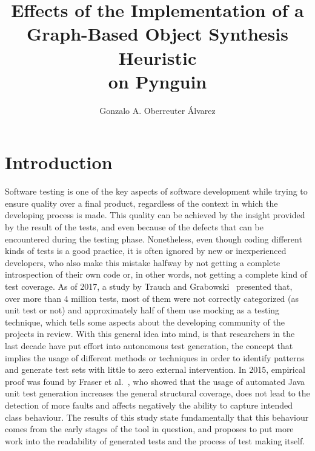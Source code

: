 \documentclass[%
  chapterprefix=false,%
  open=right,%
  twoside=true,%
  paper=a4,%
  logofile={Figures/logo.png},%
  thesistype=master,%
  UKenglish,%
]{se2thesis}
\author{Gonzalo A. Oberreuter Álvarez}
\title{Effects of the Implementation of a Graph-Based Object Synthesis Heuristic \\ on Pynguin}
\institute{Chair of Software Engineering}
\begin{document}
\frontmatter

\maketitle

\tableofcontents



\mainmatter{}

\chapter{Introduction}\label{chap:introduction}

Software testing is one of the key aspects of software development while trying to ensure quality over a final product, regardless of the context in which the developing process is made.
This quality can be achieved by the insight provided by the result of the tests, and even because of the defects that can be encountered during the testing phase.
Nonetheless, even though coding different kinds of tests is a good practice, it is often ignored by new or inexperienced developers, who also make this mistake halfway by not getting a complete introspection of their own code or, in other words, not getting a complete kind of test coverage.
As of 2017, a study by Trauch and Grabowski~\cite{DBLP:conf/icst/TrautschG17} presented that, over more than 4 million tests, most of them were not correctly categorized (as unit test or not) and approximately half of them use mocking as a testing technique, which tells some aspects about the developing community of the projects in review. 
With this general idea into mind, is that researchers in the last decade   have put effort into autonomous test generation, the concept that implies the usage of different methods or techniques in order to identify patterns and generate test sets with little to zero external intervention.
In 2015, empirical proof was found by Fraser et al.~\cite{DBLP:journals/tosem/FraserSMAP15}, who showed that the usage of automated Java unit test generation increases the general structural coverage, does not lead to the detection of more faults and affects negatively the ability to capture intended class behaviour.
The results of this study state fundamentally that this behaviour  comes from the early stages of the tool in question, and proposes to put more work into the readability of generated tests and  the process of test making itself.
\end{document}
